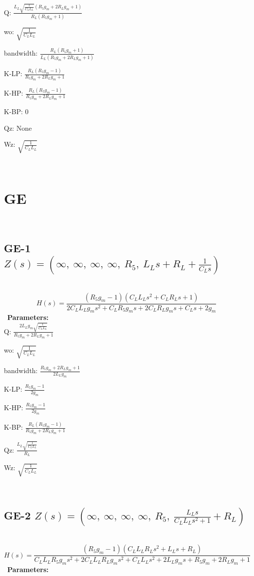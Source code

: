 \documentclass{article}
\begin{document}
Q: $\frac{L_{L} \sqrt{\frac{1}{C_{L} L_{L}}} \left(R_{5} g_{m} + 2 R_{L} g_{m} + 1\right)}{R_{L} \left(R_{5} g_{m} + 1\right)}$\ 

wo: $\sqrt{\frac{1}{C_{L} L_{L}}}$\ 

bandwidth: $\frac{R_{L} \left(R_{5} g_{m} + 1\right)}{L_{L} \left(R_{5} g_{m} + 2 R_{L} g_{m} + 1\right)}$\ 

K-LP: $\frac{R_{L} \left(R_{5} g_{m} - 1\right)}{R_{5} g_{m} + 2 R_{L} g_{m} + 1}$\ 

K-HP: $\frac{R_{L} \left(R_{5} g_{m} - 1\right)}{R_{5} g_{m} + 2 R_{L} g_{m} + 1}$\ 

K-BP: $0$\ 

Qz: $\text{None}$\ 

Wz: $\sqrt{\frac{1}{C_{L} L_{L}}}$\ 

\ 

\section{GE}\ 
\subsection{GE-1 $Z(s) = \left( \infty, \  \infty, \  \infty, \  \infty, \  R_{5}, \  L_{L} s + R_{L} + \frac{1}{C_{L} s}\right)$ } \ 
\textbf{\[H(s) = \frac{\left(R_{5} g_{m} - 1\right) \left(C_{L} L_{L} s^{2} + C_{L} R_{L} s + 1\right)}{2 C_{L} L_{L} g_{m} s^{2} + C_{L} R_{5} g_{m} s + 2 C_{L} R_{L} g_{m} s + C_{L} s + 2 g_{m}}\] } \ 
\textbf{Parameters:}\\ 

Q: $\frac{2 L_{L} g_{m} \sqrt{\frac{1}{C_{L} L_{L}}}}{R_{5} g_{m} + 2 R_{L} g_{m} + 1}$\ 

wo: $\sqrt{\frac{1}{C_{L} L_{L}}}$\ 

bandwidth: $\frac{R_{5} g_{m} + 2 R_{L} g_{m} + 1}{2 L_{L} g_{m}}$\ 

K-LP: $\frac{R_{5} g_{m} - 1}{2 g_{m}}$\ 

K-HP: $\frac{R_{5} g_{m} - 1}{2 g_{m}}$\ 

K-BP: $\frac{R_{L} \left(R_{5} g_{m} - 1\right)}{R_{5} g_{m} + 2 R_{L} g_{m} + 1}$\ 

Qz: $\frac{L_{L} \sqrt{\frac{1}{C_{L} L_{L}}}}{R_{L}}$\ 

Wz: $\sqrt{\frac{1}{C_{L} L_{L}}}$\ 

\ 

\subsection{GE-2 $Z(s) = \left( \infty, \  \infty, \  \infty, \  \infty, \  R_{5}, \  \frac{L_{L} s}{C_{L} L_{L} s^{2} + 1} + R_{L}\right)$ } \ 
\textbf{\[H(s) = \frac{\left(R_{5} g_{m} - 1\right) \left(C_{L} L_{L} R_{L} s^{2} + L_{L} s + R_{L}\right)}{C_{L} L_{L} R_{5} g_{m} s^{2} + 2 C_{L} L_{L} R_{L} g_{m} s^{2} + C_{L} L_{L} s^{2} + 2 L_{L} g_{m} s + R_{5} g_{m} + 2 R_{L} g_{m} + 1}\] } \ 
\textbf{Parameters:}\\ 
\end{document}
